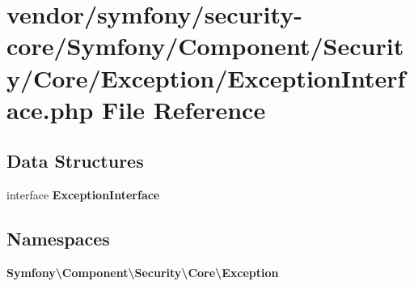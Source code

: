\section{vendor/symfony/security-\/core/\+Symfony/\+Component/\+Security/\+Core/\+Exception/\+Exception\+Interface.php File Reference}
\label{symfony_2security-core_2_symfony_2_component_2_security_2_core_2_exception_2_exception_interface_8php}
\subsection*{Data Structures}
\begin{DoxyCompactItemize}
\item 
interface {\bf Exception\+Interface}
\end{DoxyCompactItemize}
\subsection*{Namespaces}
\begin{DoxyCompactItemize}
\item 
 {\bf Symfony\textbackslash{}\+Component\textbackslash{}\+Security\textbackslash{}\+Core\textbackslash{}\+Exception}
\end{DoxyCompactItemize}
